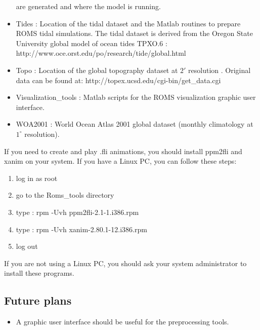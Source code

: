 \begin{itemize}
are generated and where the model is running.
\item Tides : Location of the tidal dataset and the Matlab routines 
to prepare ROMS tidal simulations.
The tidal dataset  is derived from the Oregon State University
global model of ocean tides TPXO.6 \citep{Egb02}: 
http://www.oce.orst.edu/po/research/tide/global.html
\item Topo : Location of the global topography dataset at $2'$ resolution
\citep{Smi97}. Original data can be found at:
http://topex.ucsd.edu/cgi-bin/get\_data.cgi
\item Visualization\_tools : Matlab scripts for the ROMS visualization
graphic user interface.
\item WOA2001 : World Ocean Atlas 2001 global dataset 
(monthly climatology at $1^\circ$ resolution).
\end{itemize}

If you need to create and play .fli animations, you should install ppm2fli
and xanim on your system. If you have a Linux PC, you can follow these steps:
\begin{enumerate}
\item log in as root
\item go to the Roms\_tools directory
\item type : rpm -Uvh  ppm2fli-2.1-1.i386.rpm
\item type : rpm -Uvh  xanim-2.80.1-12.i386.rpm
\item log out
\end{enumerate}
If you are not using a Linux PC, you should ask your 
system administrator to install these programs.


\subsection{Future plans}
\begin{itemize}
\item A graphic user interface should be useful for the
preprocessing tools.
\end{itemize}


